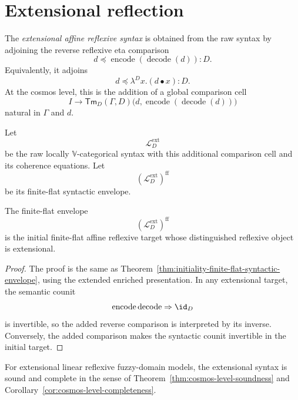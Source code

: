 \section{Extensional reflection}
\label{sec:extensional-reflection-cosmos}

\begin{definition}
\label{def:extensional-syntax-cosmos}
The \emph{extensional affine reflexive syntax} is obtained from the raw syntax
by adjoining the reverse reflexive eta comparison
\[
    d
    \preceq
    \operatorname{encode}(\operatorname{decode}(d))
    :
    D.
\]
Equivalently, it adjoins
\[
    d
    \preceq
    \lambda^D x.(d\bullet x)
    :
    D.
\]
At the cosmos level, this is the addition of a global comparison cell
\[
    I
    \longrightarrow
    \mathsf{Tm}_D(\Gamma,D)
    \bigl(d,\operatorname{encode}(\operatorname{decode}(d))\bigr)
\]
natural in \(\Gamma\) and \(d\).
\end{definition}

Let
\[
    \mathcal L_D^{\mathrm{ext}}
\]
be the raw locally \(\mathbb V\)-categorical syntax with this additional
comparison cell and its coherence equations.  Let
\[
    (\mathcal L_D^{\mathrm{ext}})^{\mathrm{ff}}
\]
be its finite-flat syntactic envelope.

\begin{theorem}
\label{thm:extensional-initiality-cosmos}
The finite-flat envelope
\[
    (\mathcal L_D^{\mathrm{ext}})^{\mathrm{ff}}
\]
is the initial finite-flat affine reflexive target whose distinguished
reflexive object is extensional.
\end{theorem}

\begin{proof}
The proof is the same as
Theorem~\ref{thm:initiality-finite-flat-syntactic-envelope}, using the
extended enriched presentation.  In any extensional target, the semantic
counit
\[
    \operatorname{encode}\operatorname{decode}
    \Rightarrow
    \id_D
\]
is invertible, so the added reverse comparison is interpreted by its inverse.
Conversely, the added comparison makes the syntactic counit invertible in the
initial target.
\end{proof}

\begin{corollary}
\label{cor:extensional-soundness-completeness-cosmos}
For extensional linear reflexive fuzzy-domain models, the extensional syntax is
sound and complete in the sense of
Theorem~\ref{thm:cosmos-level-soundness} and
Corollary~\ref{cor:cosmos-level-completeness}.
\end{corollary}

